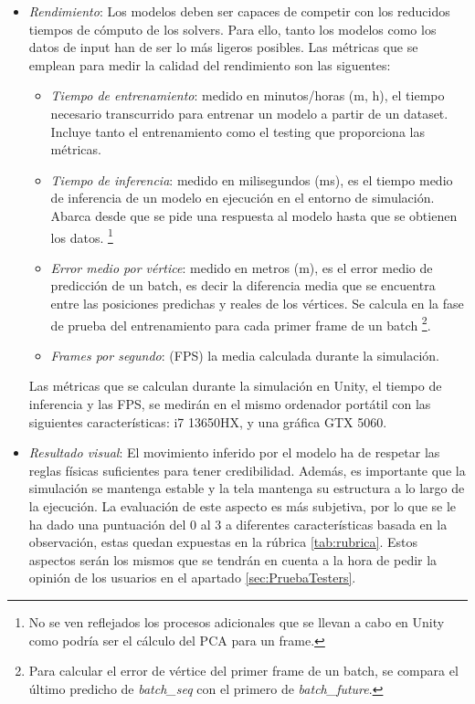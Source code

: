 \begin{itemize}
  \item \textit{Rendimiento}: Los modelos deben ser capaces de competir con los reducidos tiempos de cómputo de los solvers. Para ello, tanto los modelos como los datos de input han de ser lo más ligeros posibles. Las métricas que se emplean para medir la calidad del rendimiento son las siguentes: 
  \begin{itemize}
    \item \textit{Tiempo de entrenamiento}: medido en minutos/horas (m, h), el tiempo necesario transcurrido para entrenar un modelo a partir de un dataset. Incluye tanto el entrenamiento como el testing que proporciona las métricas. 
    \item \textit{Tiempo de inferencia}: medido en milisegundos (ms), es el tiempo medio de inferencia de un modelo en ejecución en el entorno de simulación. Abarca desde que se pide una respuesta al modelo hasta que se obtienen los datos. \footnote{No se ven reflejados los procesos adicionales que se llevan a cabo en Unity como podría ser el cálculo del PCA para un frame.}
    \item \textit{Error medio por vértice}: medido en metros (m), es el error medio de predicción de un batch, es decir la diferencia media que se encuentra entre las posiciones predichas y reales de los vértices. Se calcula en la fase de prueba del entrenamiento para cada primer frame de un batch \footnote{Para calcular el error de vértice del primer frame de un batch, se compara el último predicho de \textit{batch\_seq} con el primero de \textit{batch\_future}.}.
    \item \textit{Frames por segundo}: (FPS) la media calculada durante la simulación. 
  \end{itemize}
    Las métricas que se calculan durante la simulación en Unity, el tiempo de inferencia y las FPS, se medirán en el mismo ordenador portátil con las siguientes características: i7 13650HX, y una gráfica GTX 5060.
  \item \textit{Resultado visual}: El movimiento inferido por el modelo ha de respetar las reglas físicas suficientes para tener credibilidad. Además, es importante que la simulación se mantenga estable y la tela mantenga su estructura a lo largo de la ejecución. La evaluación de este aspecto es más subjetiva, por lo que se le ha dado una puntuación del 0 al 3 a diferentes características basada en la observación, estas quedan expuestas en la rúbrica \ref{tab:rubrica}. Estos aspectos serán los mismos que se tendrán en cuenta a la hora de pedir la opinión de los usuarios en el apartado \ref{sec:PruebaTesters}.

\end{itemize}

